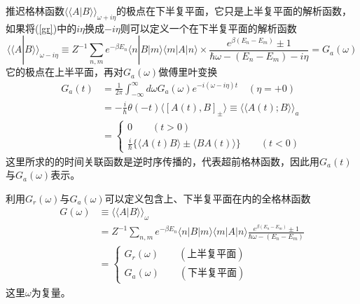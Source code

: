 \qquad 推迟格林函数$\langle\langle A|B\rangle\rangle_{\omega+i\eta}$的极点在下半复平面，它只是上半复平面的解析函数，如果将(\ref{gr})中的$i\eta$换成$-i\eta$则可以定义一个在下半复平面的解析函数
\begin{equation}
\langle\langle A|B\rangle\rangle_{\omega-i\eta}\equiv Z^{-1}\sum_{n,m}e^{-\beta E_n}\langle n|B|m\rangle\langle m|A|n\rangle\times \frac{e^{\beta(E_n-E_m)}\pm 1}{\hbar\omega-(E_n-E_m)-i\eta}=G_a(\omega)\label{gf4}
\end{equation}
它的极点在上半平面，再对$G_a(\omega)$做傅里叶变换
\begin{equation}
\begin{aligned}
G_a(t)&=\frac{1}{2\pi}\int_{-\infty}^{\infty}d\omega G_a(\omega)e^{-i(\omega-i\eta)t}\quad(\eta=+0)\\
&=-\frac{i}{\hbar}\theta(-t)\langle\left[A(t),B\right]_\pm\rangle\equiv\langle\langle A(t);B\rangle\rangle_a\\
&=\left\{
\begin{array}{cc}
0\qquad(t>0)\\
\frac{i}{\hbar}\{\langle A(t)B\rangle\pm\langle BA(t)\rangle\}\qquad(t<0)
\end{array}
\right.
\end{aligned}
\end{equation}
这里所求的的时间关联函数是逆时序传播的，代表超前格林函数，因此用$G_a(t)$与$G_a(\omega)$表示。

\qquad 利用$G_r(\omega)$与$G_a(\omega)$可以定义包含上、下半复平面在内的全格林函数
\begin{equation}
\begin{aligned}
G(\omega)&\equiv\langle\langle A|B\rangle\rangle_\omega\\
&=Z^{-1}\sum_{n,m}e^{-\beta E_n}\langle n|B|m\rangle\langle m|A|n\rangle\frac{e^{\beta(E_n-E_m)}\pm 1}{\hbar\omega-(E_n-E_m)}\\
&=\left\{
\begin{array}{cc}
G_r(\omega)\qquad(\textrm{上半复平面})\\
G_a(\omega)\qquad(\textrm{下半复平面})
\end{array}\right.\label{gf5}
\end{aligned}
\end{equation}
这里$\omega$为复量。

